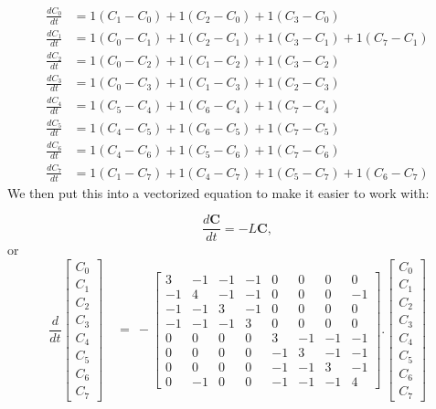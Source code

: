\documentclass{article}
\begin{document}
\[
\begin{aligned}
\frac{dC_0}{dt} & = 1(C_1 - C_0) + 1(C_2 - C_0) + 1(C_3 - C_0) \\[10pt]
\frac{dC_1}{dt} & = 1(C_0 - C_1) + 1(C_2 - C_1) + 1(C_3 - C_1) + 1(C_7 - C_1) \\[10pt]
\frac{dC_2}{dt} & = 1(C_0 - C_2) + 1(C_1 - C_2) + 1(C_3 - C_2) \\[10pt]
\frac{dC_3}{dt} & = 1(C_0 - C_3) + 1(C_1 - C_3) + 1(C_2 - C_3) \\[10pt]
\frac{dC_4}{dt} & = 1(C_5 - C_4) + 1(C_6 - C_4) + 1(C_7 - C_4) \\[10pt]
\frac{dC_5}{dt} & = 1(C_4 - C_5) + 1(C_6 - C_5) + 1(C_7 - C_5) \\[10pt]
\frac{dC_6}{dt} & = 1(C_4 - C_6) + 1(C_5 - C_6) + 1(C_7 - C_6) \\[10pt]
\frac{dC_7}{dt} & = 1(C_1 - C_7) + 1(C_4 - C_7) + 1(C_5 - C_7) + 1(C_6 - C_7)
\end{aligned}
\]
\noindent
We then put this into a vectorized equation to make it easier to work with:

\[
\frac{d\mathbf{C}}{dt} = -L \mathbf{C},
\]
or
\[
\frac{d}{dt}
\begin{bmatrix}
C_0 \\ 
C_1 \\ 
C_2 \\ 
C_3 \\ 
C_4 \\ 
C_5 \\ 
C_6 \\ 
C_7
\end{bmatrix}
\quad
=\ -
\begin{bmatrix}
 3 & -1 & -1 & -1 &  0 &  0 &  0 &  0 \\  
-1 &  4 & -1 & -1 &  0 &  0 &  0 & -1 \\  
-1 & -1 &  3 & -1 &  0 &  0 &  0 &  0 \\  
-1 & -1 & -1 &  3 &  0 &  0 &  0 &  0 \\  
 0 &  0 &  0 &  0 &  3 & -1 & -1 & -1 \\  
 0 &  0 &  0 &  0 & -1 &  3 & -1 & -1 \\  
 0 &  0 &  0 &  0 & -1 & -1 &  3 & -1 \\  
 0 & -1 &  0 &  0 & -1 & -1 & -1 &  4  
\end{bmatrix}.
\begin{bmatrix}
    C_0 \\ 
    C_1 \\ 
    C_2 \\ 
    C_3 \\ 
    C_4 \\ 
    C_5 \\ 
    C_6 \\ 
    C_7
\end{bmatrix}
\]
\end{document}
